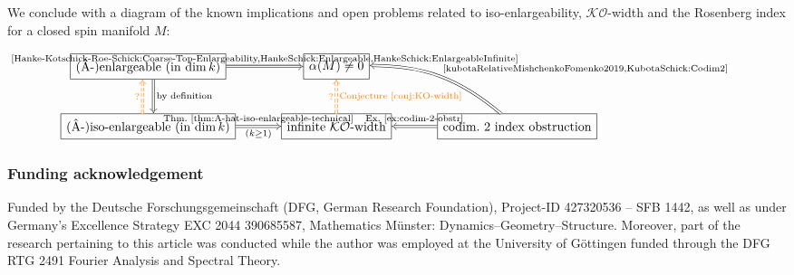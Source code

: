\documentclass[pdftex]{sigma}
\numberwithin{equation}{section}
\begin{document}
We conclude with a diagram of the known implications and open problems related to iso-enlargeability, \(\mathcal{KO}\)-width and the Rosenberg index for a closed spin manifold \(M\):

\begin{center}\small
$\begin{tikzcd}[cells={nodes={draw=black, rectangle,anchor=center,minimum height=2em}}, column sep=large, row sep=large]
 \text{(\(\Ahat\)-)enlargeable (in \(\dim k\))} \rar[Rightarrow, "\text{\cite{Hanke-Kotschick-Roe-Schick:Coarse-Top-Enlargeability,HankeSchick:Enlargeable,HankeSchick:EnlargeableInfinite}}"] \dar[Rightarrow, shift left=1ex, "\text{by definition}"] & \alpha(M) \neq 0 \\
 \text{(\(\Ahat\)-)iso-enlargeable (in \(\dim k\))} \rar[Rightarrow, "(k \geq 1)"',"\text{Thm.~\ref{thm:A-hat-iso-enlargeable-technical}}"] \uar[Rightarrow, dashed, orange, shift left=1ex, "?"]
 & \text{infinite \(\mathcal{KO}\)-width} \uar[Rightarrow, dashed, orange, "?", "\text{Conjecture~\ref{conj:KO-width}}"'] & \lar[Rightarrow, "\text{Ex.~\ref{ex:codim-2-obstr}}"']\text{codim.~2 index obstruction} \ular[Rightarrow, "\text{\cite{kubotaRelativeMishchenkoFomenko2019,KubotaSchick:Codim2}}"', bend right=20]
\end{tikzcd}$
\end{center}

\subsubsection*{Funding acknowledgement}
Funded by the Deutsche Forschungsgemeinschaft (DFG, German Research Foundation), Project-ID 427320536 – SFB 1442, as well as under Germany's Excellence Strategy EXC 2044 390685587, Mathematics M\"unster: Dynamics–Geometry–Structure.
Moreover, part of the research pertaining to this article was conducted while the author was employed at the University of G\"ottingen funded through the DFG RTG 2491 Fourier Analysis and Spectral Theory.
\end{document}
